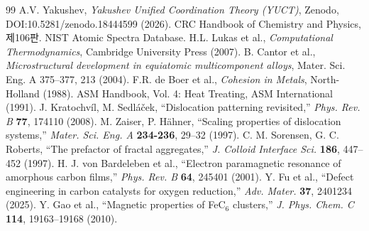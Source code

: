 \documentclass[12pt,a4paper]{article}
\begin{document}
	\begin{thebibliography}{99}
		 A.V. Yakushev, \emph{Yakushev Unified Coordination Theory (YUCT)}, Zenodo, DOI:10.5281/zenodo.18444599 (2026).
		 CRC Handbook of Chemistry and Physics, 제106판.
		 NIST Atomic Spectra Database.
		 H.L. Lukas et al., \emph{Computational Thermodynamics}, Cambridge University Press (2007).
		 B. Cantor et al., \emph{Microstructural development in equiatomic multicomponent alloys}, Mater. Sci. Eng. A 375–377, 213 (2004).
		 F.R. de Boer et al., \emph{Cohesion in Metals}, North-Holland (1988).
		 ASM Handbook, Vol. 4: Heat Treating, ASM International (1991).
		 J. Kratochv\'il, M. Sedl\'a\v{c}ek, ``Dislocation patterning revisited,'' \emph{Phys. Rev. B} \textbf{77}, 174110 (2008).
		 M. Zaiser, P. H\"ahner, ``Scaling properties of dislocation systems,'' \emph{Mater. Sci. Eng. A} \textbf{234-236}, 29–32 (1997).
		 C. M. Sorensen, G. C. Roberts, ``The prefactor of fractal aggregates,'' \emph{J. Colloid Interface Sci.} \textbf{186}, 447–452 (1997).
		 H. J. von Bardeleben et al., ``Electron paramagnetic resonance of amorphous carbon films,'' \emph{Phys. Rev. B} \textbf{64}, 245401 (2001).
		 Y. Fu et al., ``Defect engineering in carbon catalysts for oxygen reduction,'' \emph{Adv. Mater.} \textbf{37}, 2401234 (2025).
		 Y. Gao et al., ``Magnetic properties of FeC$_6$ clusters,'' \emph{J. Phys. Chem. C} \textbf{114}, 19163–19168 (2010).
	\end{thebibliography}
	
		
\end{document}
